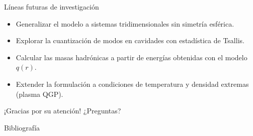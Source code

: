 \documentclass{beamer}
\begin{document}
\begin{frame}{Líneas futuras de investigación}
  \begin{itemize}
    \item Generalizar el modelo a sistemas tridimensionales sin simetría esférica.
    \item Explorar la cuantización de modos en cavidades con estadística de Tsallis.
    \item Calcular las masas hadrónicas a partir de energías obtenidas con el modelo \( q(r) \).
    \item Extender la formulación a condiciones de temperatura y densidad extremas (plasma QGP).
  \end{itemize}
\end{frame}


\begin{frame}[standout]
  \centering
  \Large ¡Gracias por su atención!
  \centering
  \Huge ¿Preguntas?
\end{frame}

\appendix
\begin{frame}[allowframebreaks]{Bibliografía}
  \printbibliography
\end{frame}
\end{document}
